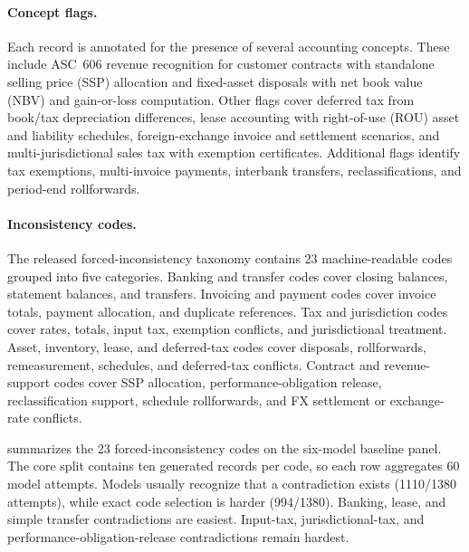 \paragraph{Concept flags.}
Each record is annotated for the presence of several accounting concepts. These include ASC~606 revenue recognition for customer contracts with standalone selling price (SSP) allocation and fixed-asset disposals with net book value (NBV) and gain-or-loss computation. Other flags cover deferred tax from book/tax depreciation differences, lease accounting with right-of-use (ROU) asset and liability schedules, foreign-exchange invoice and settlement scenarios, and multi-jurisdictional sales tax with exemption certificates. Additional flags identify tax exemptions, multi-invoice payments, interbank transfers, reclassifications, and period-end rollforwards.

\paragraph{Inconsistency codes.}
The released forced-inconsistency taxonomy contains 23 machine-readable codes grouped into five categories. Banking and transfer codes cover closing balances, statement balances, and transfers. Invoicing and payment codes cover invoice totals, payment allocation, and duplicate references. Tax and jurisdiction codes cover rates, totals, input tax, exemption conflicts, and jurisdictional treatment. Asset, inventory, lease, and deferred-tax codes cover disposals, rollforwards, remeasurement, schedules, and deferred-tax conflicts. Contract and revenue-support codes cover SSP allocation, performance-obligation release, reclassification support, schedule rollforwards, and FX settlement or exchange-rate conflicts.

 summarizes the 23 forced-inconsistency codes on the six-model baseline panel. The core split contains ten generated records per code, so each row aggregates 60 model attempts. Models usually recognize that a contradiction exists (1110/1380 attempts), while exact code selection is harder (994/1380). Banking, lease, and simple transfer contradictions are easiest. Input-tax, jurisdictional-tax, and performance-obligation-release contradictions remain hardest.

